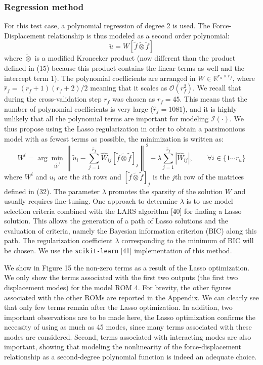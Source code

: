 \documentclass[11pt]{article}
\begin{document}
\subsubsection{Regression method}

For this test case, a polynomial regression of degree 2 is used. The Force-Displacement relationship is thus modeled as a second order polynomial:
\begin{equation}
\tag{32}
\tilde{u} = W[\tilde{f} \widetilde{\otimes} \tilde{f}]
\end{equation}
where $\widetilde{\otimes}$ is a modified Kronecker product (now different than the product defined in (15) because this product contains the linear terms as well and the intercept term 1). The polynomial coefficients are arranged in $W \in \mathbb{R}^{r_u \times \hat{r}_f}$, where $\hat{r}_f = (r_f + 1)(r_f + 2)/2$ meaning that it scales as $\mathcal{O}(r_f^2)$. We recall that during the cross-validation step $r_f$ was chosen as $r_f = 45$. This means that the number of polynomial coefficients is very large ($\hat{r}_f = 1081$), and it is highly unlikely that all the polynomial terms are important for modeling $\mathcal{I}(\cdot)$. We thus propose using the Lasso regularization in order to obtain a parsimonious model with as fewest terms as possible, the minimization is written as:
\begin{equation}
\tag{33}
W^i =
\arg\min_{\widehat{W}^{\,i}}
\left\|
\tilde{u}_i - \sum_{j=1}^{\hat{r}_f} \widehat{W}_{ij}[\tilde{f} \widetilde{\otimes} \tilde{f}]_j
\right\|^2
+
\lambda \sum_{j=1}^{\hat{r}_f} |\widehat{W}_{ij}|,
\qquad \forall i \in \{1 \cdots r_u\}
\end{equation}
where $W^i$ and $u_i$ are the $i$th rows and $[\tilde{f} \widetilde{\otimes} \tilde{f}]_j$ is the $j$th row of the matrices defined in (32). The parameter $\lambda$ promotes the sparsity of the solution $W$ and usually requires fine-tuning. One approach to determine $\lambda$ is to use model selection criteria combined with the LARS algorithm [40] for finding a Lasso solution. This allows the generation of a path of Lasso solutions and the evaluation of criteria, namely the Bayesian information criterion (BIC) along this path. The regularization coefficient $\lambda$ corresponding to the minimum of BIC will be chosen. We use the \texttt{scikit-learn} [41] implementation of this method.

We show in Figure 15 the non-zero terms as a result of the Lasso optimization. We only show the terms associated with the first two outputs (the first two displacement modes) for the model ROM 4. For brevity, the other figures associated with the other ROMs are reported in the Appendix. We can clearly see that only few terms remain after the Lasso optimization. In addition, two important observations are to be made here, the Lasso optimization confirms the necessity of using as much as 45 modes, since many terms associated with these modes are considered. Second, terms associated with interacting modes are also important, showing that modeling the nonlinearity of the force-displacement relationship as a second-degree polynomial function is indeed an adequate choice.
\end{document}
